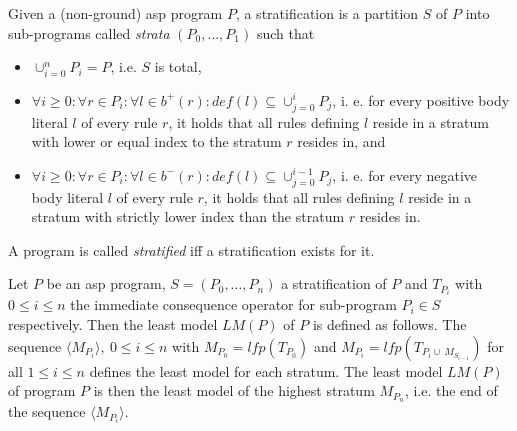\begin{definition}
\label{def:prelims-asp-semantics-stratification}
Given a (non-ground) \gls{asp} program $P$, a stratification is a partition $S$ of $P$ into sub-programs called \emph{strata} $(P_0,\ldots,P_1)$ such that
\begin{itemize}
	\item $\cup^{n}_{i = 0} P_i = P$, i.e. $S$ is total,
	\item $\forall i \geq 0: \forall r \in P_i: \forall l \in b^{+}(r): \mathit{def}(l) \subseteq \cup^{i}_{j = 0} P_j$, i. e. for every positive body literal $l$ of every rule $r$, it holds that all rules defining $l$ reside in a stratum with lower or equal index to the stratum $r$ resides in, and
	\item $\forall i \geq 0: \forall r \in P_i: \forall l \in b^{-}(r): \mathit{def}(l) \subseteq \cup^{i - 1}_{j = 0} P_j$, i. e. for every negative body literal $l$ of every rule $r$, it holds that all rules defining $l$ reside in a stratum with strictly lower index than the stratum $r$ resides in.
\end{itemize}
A program is called \emph{stratified} iff a stratification exists for it.
\end{definition}

\begin{definition}
\label{def:prelims-asp-semantics-stratified-eval}
Let $P$ be an \gls{asp} program, $S = (P_0,\ldots,P_n)$ a stratification of $P$ and $T_{P_i}$ with $0 \leq i \leq n$ the immediate consequence operator for sub-program $P_i \in S$ respectively. Then the least model $\mathit{LM}(P)$ of $P$ is defined as follows.
The sequence $\langle M_{P_i} \rangle,\ 0 \leq i \leq n$ with $M_{P_0} = \mathit{lfp}(T_{P_0})$ and $M_{P_i} = \mathit{lfp}(T_{P_i \cup\ M_{S_{i-1}}})$ for all $1 \leq i \leq n$ defines the least model for each stratum. The least model $LM(P)$ of program $P$ is then the least model of the highest stratum $M_{P_n}$, i.e. the end of the sequence $\langle M_{P_i} \rangle$.
\end{definition}

